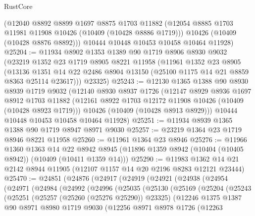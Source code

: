 \begin{lexlean}{RustCore}
\begin{coremodule}
      (@12040
        @8892
        @8899
        @1697
        @8875
        @1703
        @11882
        (@12054 @8885 @1703 @11981 @11908 @10426 (@10409 (@10428 @8886 @1719)))
        @10426
        (@10409 (@10428 @8876 @8892)))
      @10444
      @10448
      @10453
      @10458
      @10464
      @11928)
@25204 := @11934
    @8902
    @1353
    @1389
    @90
    @1719
    @8906
    @8930
    @9032
    (@23219
      @1352
      @23
      @1719
      @8905
      @8221
      @11958
      (@11961
        @1352
        @23
        @8905
        (@13136 @1351 @14 @22 @2486 @8904 @13150 (@25100 @1175 @14 @21 @8859 @8363 @25114 @23617)))
      @23325)
@25243 := @12130
    @1365
    @1388
    @90
    @8930
    @8939
    @1719
    @9032
    (@12140
      @8930
      @8937
      @1726
      (@12147
        @8929
        @8936
        @1697
        @8912
        @1703
        @11882
        (@12161 @8922 @1703 @12172 @11908 @10426 (@10409 (@10428 @8923 @1719)))
        @10426
        (@10409 (@10428 @8913 @8929)))
      @10444
      @10448
      @10453
      @10458
      @10464
      @11928)
@25251 := @11934 @8939 @1365 @1388 @90 @1719 @8947 @8971 @9030
@25257 := @23219 @1364 @23 @1719 @8946 @8221 @11958
@25260 := @11961 @1364 @23 @8946
@25276 := @11966
    @1360
    @1363
    @14
    @22
    @8942
    @8945
    (@11896 @1359 @8942 (@10404 (@10405 @8942)) (@10409 (@10411 @1359 @14)))
@25290 := @11983 @1362 @14 @21 @2142 @8944 @11905 (@12107 @1157 @14 @20 @2196 @8283 @12121 @23444)
@25470 := @24851
    (@24876
      (@24917
        (@24919
          (@24921
            (@24938
              (@24954
                (@24971
                  (@24984
                    (@24992
                      (@24996
                        (@25035
                          (@25130
                            (@25169
                              (@25204
                                (@25243
                                  (@25251
                                    (@25257 (@25260 (@25276 @25290)) @23325)
                                    (@12246
                                      @1375
                                      @1387
                                      @90
                                      @8971
                                      @8980
                                      @1719
                                      @9030
                                      (@12256
                                        @8971
                                        @8978
                                        @1726
                                        (@12263

\end{coremodule}
\end{lexlean}
